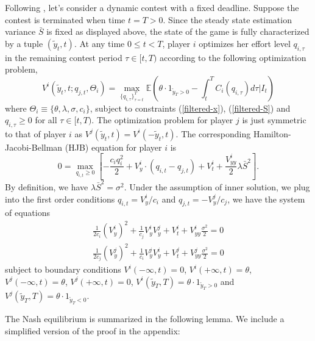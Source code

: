 \documentclass[mnsc]{informs3}
\begin{document}
Following \cite{ryvkin2022fight}, let's consider a dynamic contest with a fixed deadline. 
Suppose the contest is terminated when time $t=T>0$. 
Since the steady state estimation variance $\bar{S}$ is fixed as displayed above, the state of the game is fully characterized by a tuple $(\tilde{y}_t, t)$. 
At any time $0\le t<T$, player $i$ optimizes her effort level $q_{i,\tau}$ in the remaining contest period $\tau\in[t, T)$ according to the following optimization problem, 
\begin{equation}\label{v-def}
	V^i(\tilde{y}_{t}, t ; q_{j,t},\Theta_i) = \max_{\{q_{i,\tau}\}^T_{\tau=t}} 
	\mathbb{E}\left( \theta\cdot1_{\tilde{y}_T>0} - \int^T_tC_i(q_{i,\tau})d\tau \bigg|I_t\right) 
\end{equation}
where $\Theta_i \equiv\{\theta, \lambda, \sigma, c_i\}$, subject to constraints (\ref{filtered-x}), (\ref{filtered-S}) and $q_{i,\tau}\ge0$ for all $\tau\in[t,T)$.
The optimization problem for player $j$ is just symmetric to that of player $i$ as $V^j(\tilde{y}_t, t) = V^i(-\tilde{y}_t, t)$. 
The corresponding Hamilton-Jacobi-Bellman (HJB) equation for player $i$ is 
\begin{equation*}
0 = \max_{q_{i,t}\ge0}\left[-\frac{c_iq_i^2}{2} + V^i_{y}\cdot\left(q_{i,t}-q_{j,t}\right)+V^i_t + \frac{V^i_{yy}}{2}\lambda \bar{S}^2\right].
\end{equation*}
By definition, we have $\lambda \bar{S}^2 = \sigma^2$. 
Under the assumption of inner solution, we plug into the first order conditions $q_{i,t} = V^i_y/c_i$ and $q_{j,t} = -V^j_y/c_j$, we have the system of equations
\begin{equation*}
\begin{aligned}
\frac{1}{2c_i}(V^i_y)^2 + \frac{1}{c_j}V^i_yV^j_y + V^i_t + V^i_{yy}\frac{\sigma^2}{2} = 0\\
\frac{1}{2c_j}(V^j_y)^2 + \frac{1}{c_i}V^j_yV^i_y + V^j_t + V^j_{yy}\frac{\sigma^2}{2} = 0
\end{aligned}
\end{equation*}
subject to boundary conditions $V^i(-\infty, t) = 0$, $V^i(+\infty, t) = \theta$, $V^j(-\infty, t) = \theta$, $V^j(+\infty, t)=0$, $V^i(\tilde{y}_T, T) = \theta \cdot 1_{\tilde{y}_T > 0}$ and $V^j(\tilde{y}_T, T) = \theta \cdot 1_{\tilde{y}_T < 0}$. 


The Nash equilibrium is summarized in the following lemma. 
We include a simplified version of the proof in the appendix: 
\end{document}
